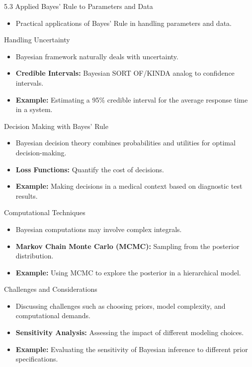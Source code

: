 \documentclass{beamer}
\begin{document}
\begin{frame}{5.3 Applied Bayes' Rule to Parameters and Data}
  \begin{itemize}
    \item Practical applications of Bayes' Rule in handling parameters and data.
  \end{itemize}
\end{frame}



\begin{frame}{Handling Uncertainty}
  \begin{itemize}
    \item Bayesian framework naturally deals with uncertainty.
    \item \textbf{Credible Intervals:} Bayesian SORT OF/KINDA analog to confidence intervals.
    \item \textbf{Example:} Estimating a 95\% credible interval for the average response time in a system.
  \end{itemize}
\end{frame}

\begin{frame}{Decision Making with Bayes' Rule}
  \begin{itemize}
    \item Bayesian decision theory combines probabilities and utilities for optimal decision-making.
    \item \textbf{Loss Functions:} Quantify the cost of decisions.
    \item \textbf{Example:} Making decisions in a medical context based on diagnostic test results.
  \end{itemize}
\end{frame}

\begin{frame}{Computational Techniques}
  \begin{itemize}
    \item Bayesian computations may involve complex integrals.
    \item \textbf{Markov Chain Monte Carlo (MCMC):} Sampling from the posterior distribution.
    \item \textbf{Example:} Using MCMC to explore the posterior in a hierarchical model.
  \end{itemize}
\end{frame}

\begin{frame}{Challenges and Considerations}
  \begin{itemize}
    \item Discussing challenges such as choosing priors, model complexity, and computational demands.
    \item \textbf{Sensitivity Analysis:} Assessing the impact of different modeling choices.
    \item \textbf{Example:} Evaluating the sensitivity of Bayesian inference to different prior specifications.
  \end{itemize}
\end{frame}
\end{document}
